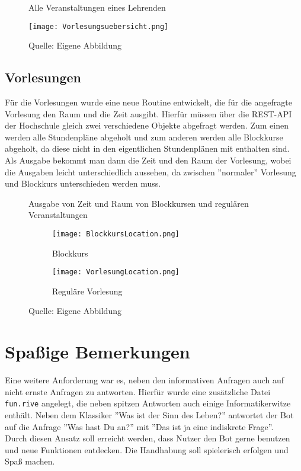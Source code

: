 \begin{figure}[!htb]
    \centering
    \caption{Alle Veranstaltungen eines Lehrenden}
      \texttt{[image: Vorlesungsuebersicht.png]}
      \label{img:vorlesungsuebersicht}
    \caption*{Quelle: Eigene Abbildung}
\end{figure}

\subsection{Vorlesungen}
Für die Vorlesungen wurde eine neue Routine entwickelt, die für die angefragte Vorlesung den Raum und die Zeit ausgibt. Hierfür müssen über die REST-API der Hochschule gleich zwei verschiedene Objekte abgefragt werden. Zum einen werden alle Stundenpläne abgeholt und zum anderen werden alle Blockkurse abgeholt, da diese nicht in den eigentlichen Stundenplänen mit enthalten sind. Als Ausgabe bekommt man dann die Zeit und den Raum der Vorlesung, wobei die Ausgaben leicht unterschiedlich aussehen, da zwischen ''normaler'' Vorlesung und Blockkurs unterschieden werden muss.

\begin{figure}[!htb]
    \centering
    \caption{Ausgabe von Zeit und Raum von Blockkursen und regulären Veranstaltungen}
    \begin{subfigure}{.5\textwidth}
        \centering
        \caption{Blockkurs}
          \texttt{[image: BlockkursLocation.png]}
          \label{img:blockkurs}
    \end{subfigure}%
    \begin{subfigure}{.5\textwidth}
        \centering
        \caption{Reguläre Vorlesung}
          \texttt{[image: VorlesungLocation.png]}
          \label{img:vorlesung}
    \end{subfigure}
    \caption*{Quelle: Eigene Abbildung}
    \label{fig:blockkursUndVorlesung}
    \end{figure}

\section{Spaßige Bemerkungen}
Eine weitere Anforderung war es, neben den informativen Anfragen auch auf nicht ernste Anfragen zu antworten. Hierfür wurde eine zusätzliche Datei \texttt{fun.rive} angelegt, die neben spitzen Antworten auch einige Informatikerwitze enthält. Neben dem Klassiker ''Was ist der Sinn des Leben?'' antwortet der Bot auf die Anfrage ''Was hast Du an?'' mit ''Das ist ja eine indiskrete Frage''. \\
Durch diesen Ansatz soll erreicht werden, dass Nutzer den Bot gerne benutzen und neue Funktionen entdecken. Die Handhabung soll spielerisch erfolgen und Spaß machen.

